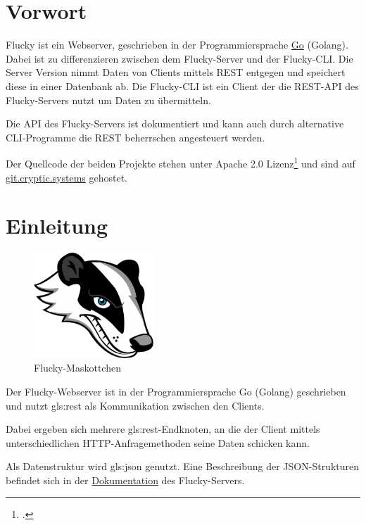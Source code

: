 \section{Vorwort}%
\label{sec:vorwort}
Flucky ist ein Webserver, geschrieben in der Programmiersprache \href{https://golang.org/}{Go} (Golang). Dabei ist zu differenzieren zwischen dem Flucky-Server und der Flucky-CLI. Die Server Version nimmt Daten von Clients mittels REST entgegen und speichert diese in einer Datenbank ab. Die Flucky-CLI ist ein Client der die REST-API des Flucky-Servers nutzt um Daten zu übermitteln.

Die API des Flucky-Servers ist dokumentiert und kann auch durch alternative CLI-Programme die REST beherrschen angesteuert werden.

Der Quellcode der beiden Projekte stehen unter Apache 2.0 Lizenz\footcite{apache-licence} und sind auf \href{https://git.cryptic.systems}{git.cryptic.systems} gehostet.


\section{Einleitung}%
\label{sec:einleitung}

\begin{figure}
  \includegraphics[width=0.4\textwidth]{img/flucky.png}
  \caption{Flucky-Maskottchen}
\end{figure}

Der Flucky-Webserver ist in der Programmiersprache Go (Golang) geschrieben und nutzt \Gls{gls:rest} als Kommunikation zwischen den Clients.

Dabei ergeben sich mehrere \Gls{gls:rest}-Endknoten, an die der Client mittels unterschiedlichen HTTP-Anfragemethoden seine Daten schicken kann.

Als Datenstruktur wird \Gls{gls:json} genutzt. Eine Beschreibung der JSON-Strukturen befindet sich in der \href{https://git.cryptic.systems/fh-trier/go-flucky-server/wiki}{Dokumentation} des Flucky-Servers.

